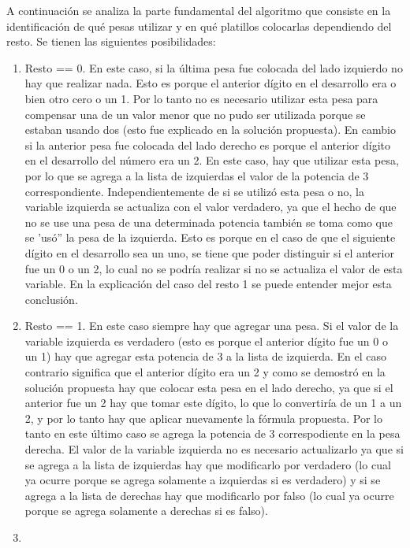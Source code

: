 	A continuación se analiza la parte fundamental del algoritmo que consiste en la identificación de qué pesas utilizar y en qué platillos colocarlas dependiendo del resto. Se tienen las siguientes posibilidades: 

	\begin{enumerate}
		\item{
			Resto == 0. En este caso, si la última pesa fue colocada del lado izquierdo no hay que realizar nada. Esto es porque el anterior dígito en el desarrollo era o bien otro cero o un 1. Por lo tanto no es necesario utilizar esta pesa para compensar una de un valor menor que no pudo ser utilizada porque se estaban usando dos (esto fue explicado en la solución propuesta). En cambio si la anterior pesa fue colocada del lado derecho es porque el anterior dígito en el desarrollo del número era un 2. En este caso, hay que utilizar esta pesa, por lo que se agrega a la lista de izquierdas el valor de la potencia de 3 correspondiente. Independientemente de si se utilizó esta pesa o no, la variable izquierda se actualiza con el valor verdadero, ya que el hecho de que no se use una pesa de una determinada potencia también se toma como que se 'usó'' la pesa de la izquierda. Esto es porque en el caso de que el siguiente dígito en el desarrollo sea un uno, se tiene que poder distinguir si el anterior fue un 0 o un 2, lo cual no se podría realizar si no se actualiza el valor de esta variable. En la explicación del caso del resto 1 se puede entender mejor esta conclusión. 
		}
		\item{
			Resto == 1. En este caso siempre hay que agregar una pesa. Si el valor de la variable izquierda es verdadero (esto es porque el anterior dígito fue un 0 o un 1) hay que agregar esta potencia de 3 a la lista de izquierda. En el caso contrario significa que el anterior dígito era un 2 y como se demostró en la solución propuesta hay que colocar esta pesa en el lado derecho, ya que si el anterior fue un 2 hay que tomar este dígito, lo que lo convertiría de un 1 a un 2, y por lo tanto hay que aplicar nuevamente la fórmula propuesta. Por lo tanto en este último caso se agrega la potencia de 3 correspodiente en la pesa derecha. El valor de la variable izquierda no es necesario actualizarlo ya que si se agrega a la lista de izquierdas hay que modificarlo por verdadero (lo cual ya ocurre porque se agrega solamente a izquierdas si es verdadero) y si se agrega a la lista de derechas hay que modificarlo por falso (lo cual ya ocurre porque se agrega solamente a derechas si es falso).
		}
		\item{
}
\end{enumerate}
